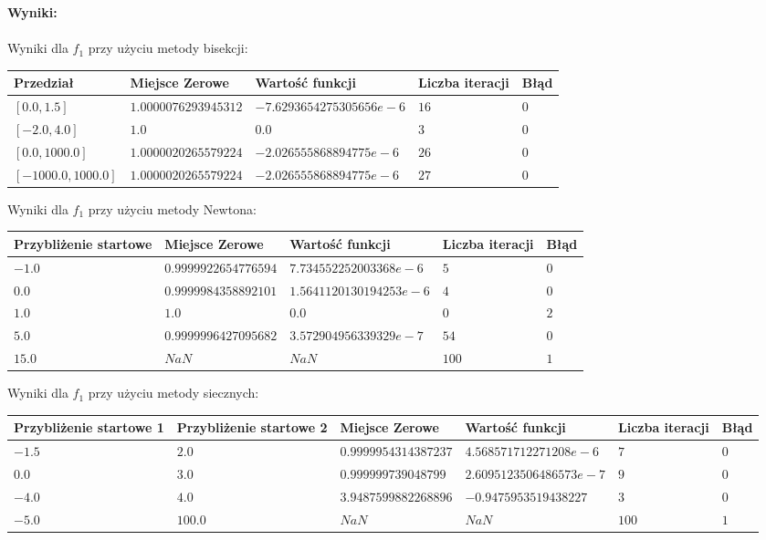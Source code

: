 \documentclass{article}
\begin{document}
\newpage
\noindent \textbf{Wyniki: }\\\\
Wyniki dla $f_1$ przy użyciu metody bisekcji:
\begin{center}
	\begin{tabular}{|p{3cm}|p{3.5cm}|p{4cm}|p{3cm}|p{2cm}|} \hline
		\textbf{Przedział} & \textbf{Miejsce Zerowe} & \textbf{Wartość funkcji} & \textbf{Liczba iteracji} & \textbf{Błąd} \\
		\hline
		 $[0.0,1.5]$ & $1.0000076293945312$ & $-7.6293654275305656e-6$ & $16$ & $0$  \\
		\hline
		 $[-2.0,4.0]$ & $1.0$ & $0.0$ & $3$ & $0$  \\
		\hline
		 $[0.0,1000.0]$ & $1.0000020265579224$ & $-2.026555868894775e-6$ & $26$ & $0$  \\
		\hline
		 $[-1000.0,1000.0]$ & $1.0000020265579224$ & $-2.026555868894775e-6$ & $27$ & $0$  \\
		\hline
	\end{tabular}
\end{center}
Wyniki dla $f_1$ przy użyciu metody Newtona:
\begin{center}
	\begin{tabular}{|p{3cm}|p{3.5cm}|p{4cm}|p{3cm}|p{2cm}|} \hline
		\textbf{Przybliżenie startowe} & \textbf{Miejsce Zerowe} & \textbf{Wartość funkcji} & \textbf{Liczba iteracji} & \textbf{Błąd} \\
		\hline
		$-1.0$ & $0.9999922654776594$ & $7.734552252003368e-6$ & $5$ & $0$ \\
		\hline
		$0.0$ & $0.9999984358892101$ & $1.5641120130194253e-6$ & $4$ & $0$ \\
		\hline
		$1.0$ & $1.0$ & $0.0$ & $0$ & $2$  \\
		\hline
		$5.0$ & $0.9999996427095682$ & $3.572904956339329e-7$ & $54$ & $0$ \\
		\hline
		$15.0$ & $NaN$ & $NaN$ & $100$ & $1$ \\
		\hline
	\end{tabular}
\end{center}
Wyniki dla $f_1$ przy użyciu metody siecznych:
\begin{center}
	\begin{tabular}{|p{2cm}|p{2cm}|p{3.5cm}|p{4cm}|p{2.5cm}|p{1cm}|} \hline
		\textbf{Przybliżenie startowe 1} & \textbf{Przybliżenie startowe 2} & \textbf{Miejsce Zerowe} & \textbf{Wartość funkcji} & \textbf{Liczba iteracji} & \textbf{Błąd} \\
		\hline
		 $-1.5$ & $2.0$ & $0.9999954314387237$ & $4.568571712271208e-6$ & $7$ & $0$  \\
		\hline
		 $0.0$ & $3.0$ & $0.999999739048799$ & $2.6095123506486573e-7$ & $9$ & $0$  \\
		\hline
		 $-4.0$ & $4.0$ & $3.9487599882268896$ & $-0.9475953519438227$ & $3$ & $0$ \\
		\hline
		 $-5.0$ & $100.0$ & $NaN$ & $NaN$ & $100$ & $1$ \\
		\hline
	\end{tabular}
\end{center}
\end{document}
